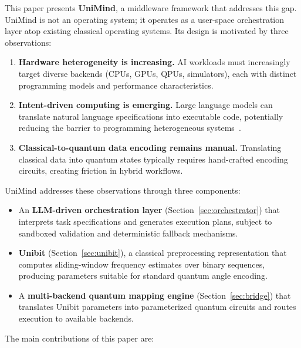 ﻿\documentclass[12pt,a4paper]{article}
\begin{document}
This paper presents \textbf{UniMind}, a middleware framework that addresses this gap. UniMind is not an operating system; it operates as a user-space orchestration layer atop existing classical operating systems. Its design is motivated by three observations:

\begin{enumerate}[leftmargin=2em]
    \item \textbf{Hardware heterogeneity is increasing.} AI workloads must increasingly target diverse backends (CPUs, GPUs, QPUs, simulators), each with distinct programming models and performance characteristics.
    \item \textbf{Intent-driven computing is emerging.} Large language models can translate natural language specifications into executable code, potentially reducing the barrier to programming heterogeneous systems~\cite{wang2024}.
    \item \textbf{Classical-to-quantum data encoding remains manual.} Translating classical data into quantum states typically requires hand-crafted encoding circuits, creating friction in hybrid workflows.
\end{enumerate}

UniMind addresses these observations through three components:

\begin{itemize}
    \item An \textbf{LLM-driven orchestration layer} (Section~\ref{sec:orchestrator}) that interprets task specifications and generates execution plans, subject to sandboxed validation and deterministic fallback mechanisms.
    \item \textbf{Unibit} (Section~\ref{sec:unibit}), a classical preprocessing representation that computes sliding-window frequency estimates over binary sequences, producing parameters suitable for standard quantum angle encoding.
    \item A \textbf{multi-backend quantum mapping engine} (Section~\ref{sec:bridge}) that translates Unibit parameters into parameterized quantum circuits and routes execution to available backends.
\end{itemize}

The main contributions of this paper are:
\end{document}
